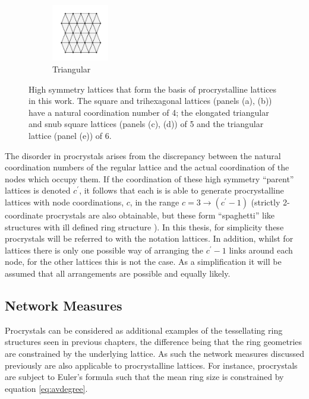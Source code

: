 \begin{figure}[bt]
     \begin{subfigure}[b]{0.3\textwidth}
         \centering
         \includegraphics[height=2.5cm]{./figures/procrystals/tri.pdf}
         \caption{Triangular}
         \label{fig:symlattri}
     \end{subfigure}
     \hfill

     \caption{High symmetry lattices that form the basis of \td{} procrystalline lattices in this work. The square and trihexagonal lattices (panels (a), (b)) have a natural coordination number of 4; the elongated triangular and snub square lattices (panels (c), (d))  of 5 and the triangular lattice (panel (e)) of 6.}
     \label{fig:symlat}
\end{figure}

The disorder in procrystals arises from the discrepancy between the natural coordination numbers of the regular lattice and the actual coordination of the nodes which occupy them.
If the coordination of these high symmetry ``parent'' lattices is denoted $c^\prime$, it follows that each is is able to generate procrystalline lattices with node coordinations, $c$, in the range $c=3\rightarrow \left(c^\prime-1\right)$ (strictly 2\--coordinate procrystals are also obtainable, but these form ``spaghetti'' like structures with ill defined ring structure \cite{Baise2018}).
In this thesis, for simplicity these procrystals will be referred to with the notation lattices.
In addition, whilst for lattices there is only one possible way of arranging the $c^\prime-1$ links around each node, for the other lattices this is not the case.
As a simplification it will be assumed that all arrangements are possible and equally likely.

\subsection{Network Measures}

Procrystals can be considered as additional examples of the tessellating ring structures seen in previous chapters, the difference being that the ring geometries are constrained by the underlying lattice. 
As such the network measures discussed previously are also applicable to procrystalline lattices.  
For instance, procrystals are subject to Euler's formula such that the mean ring size is constrained by equation \eqref{eq:avdegree}.

